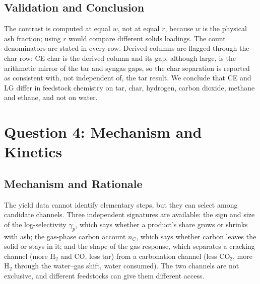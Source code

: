 \documentclass[withoutpreface,bwprint]{apmcmthesis}
\begin{document}
\subsection{Validation and Conclusion}
The contrast is computed at equal $w$, not at equal $r$, because $w$ is the physical ash fraction; using $r$ would compare different solids loadings. The count denominators are stated in every row. Derived columns are flagged through the char row: CE char is the derived column and its gap, although large, is the arithmetic mirror of the tar and syngas gaps, so the char separation is reported as consistent with, not independent of, the tar result. We conclude that CE and LG differ in feedstock chemistry on tar, char, hydrogen, carbon dioxide, methane and ethane, and not on water.

\section{Question 4: Mechanism and Kinetics}
\label{sec:q4}
\subsection{Mechanism and Rationale}
The yield data cannot identify elementary steps, but they can select among candidate channels. Three independent signatures are available: the sign and size of the log-selectivity $\gamma_p$, which says whether a product's share grows or shrinks with ash; the gas-phase carbon account $n_C$, which says whether carbon leaves the solid or stays in it; and the shape of the gas response, which separates a cracking channel (more H$_2$ and CO, less tar) from a carbonation channel (less CO$_2$, more H$_2$ through the water--gas shift, water consumed). The two channels are not exclusive, and different feedstocks can give them different access.
\end{document}
